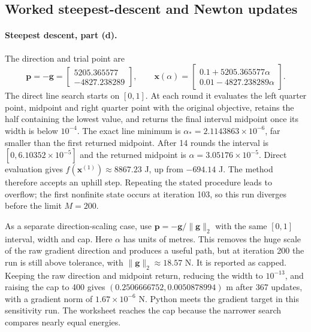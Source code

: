 \clearpage
\subsection{Worked steepest-descent and Newton updates}
\paragraph{Steepest descent, part (d).}
The direction and trial point are
\[
\bm p=-\bm g=
\begin{bmatrix}5205.365577\\-4827.238289\end{bmatrix},
\qquad
\bm x(\alpha)=
\begin{bmatrix}0.1+5205.365577\alpha\\0.01-4827.238289\alpha\end{bmatrix}.
\]
The direct line search starts on $[0,1]$. At each round it evaluates the
left quarter point, midpoint and right quarter point with the original
objective, retains the half containing the lowest value, and returns the
final interval midpoint once its width is below $10^{-4}$. The exact line
minimum is $\alpha_*=2.1143863\times10^{-6}$, far smaller than the first
returned midpoint. After 14 rounds the interval is
$[0,6.10352\times10^{-5}]$ and the returned midpoint is
$\alpha=3.05176\times10^{-5}$. Direct evaluation gives
$f(\bm x^{(1)})\approx8867.23$ J, up from $-694.14$ J. The method therefore
accepts an uphill step. Repeating the stated procedure leads to overflow;
the first nonfinite state occurs at iteration 103, so this run diverges
before the limit $M=200$.

As a separate direction-scaling case, use
$\bm p=-\bm g/\|\bm g\|_2$ with the same $[0,1]$ interval, width and cap.
Here $\alpha$ has units of metres. This removes the huge scale of the raw
gradient direction and produces a useful path, but at iteration 200 the
run is still above tolerance, with $\|\bm g\|_2\approx18.57$ N. It is
reported as capped. Keeping the raw direction and midpoint return,
reducing the width to $10^{-13}$, and raising the cap to 400 gives
$(0.2506666752,0.0050878994)$ m after 367 updates, with a gradient norm
of $1.67\times10^{-6}$ N. Python meets the gradient target in this sensitivity run. The worksheet
reaches the cap because the narrower search compares nearly equal energies.

